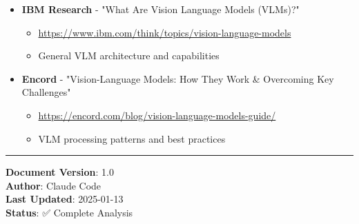 \documentclass[11pt,a4paper]{article}
\begin{document}
\begin{itemize}[leftmargin=*]
    \item \textbf{IBM Research} - "What Are Vision Language Models (VLMs)?"
    \begin{itemize}
        \item \url{https://www.ibm.com/think/topics/vision-language-models}
        \item General VLM architecture and capabilities
    \end{itemize}

    \item \textbf{Encord} - "Vision-Language Models: How They Work \& Overcoming Key Challenges"
    \begin{itemize}
        \item \url{https://encord.com/blog/vision-language-models-guide/}
        \item VLM processing patterns and best practices
    \end{itemize}
\end{itemize}

\vspace{0.5cm}
\hrule
\vspace{0.3cm}

\noindent\textbf{Document Version}: 1.0\\
\textbf{Author}: Claude Code\\
\textbf{Last Updated}: 2025-01-13\\
\textbf{Status}: ✅ Complete Analysis
\end{document}
